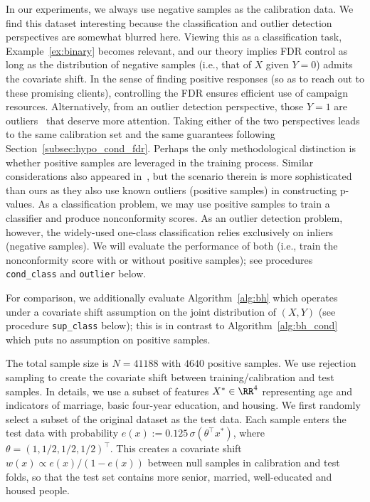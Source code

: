 In our experiments, we always use negative samples as the calibration data.
We find this dataset interesting because
the classification and outlier detection perspectives
are somewhat blurred here.
Viewing this as a classification task, Example~\ref{ex:binary}
becomes relevant, and our theory implies FDR control as long as the
distribution of negative samples
(i.e., that of $X$ given $Y=0$) admits the covariate shift.
In the sense of finding positive responses (so as to reach out
to these promising clients),
controlling the FDR ensures efficient use of campaign resources.
Alternatively, from an outlier detection perspective,
those $Y=1$ are outliers~\cite{pang2019deep} that
deserve more attention.
Taking either of the two perspectives leads to the same calibration set
and the same guarantees following Section~\ref{subsec:hypo_cond_fdr}.
%
Perhaps the only methodological distinction is
whether positive samples are leveraged in the
training process. Similar considerations
also appeared in~\cite{liang2022integrative}, but the scenario therein
is more sophisticated than ours as they also use
known outliers (positive samples) in
constructing p-values.
As a classification problem, we may use positive samples to train
a classifier and produce nonconformity scores.
As an outlier detection problem, however,
the widely-used  one-class classification
relies exclusively on inliers (negative samples).
We will evaluate the performance of both
(i.e., train the nonconformity score with or without positive samples);
see procedures \texttt{cond\_class} and \texttt{outlier} below.

For comparison, we additionally evaluate Algorithm~\ref{alg:bh}
which operates under a covariate shift assumption
on the joint distribution of $(X,Y)$ (see procedure \texttt{sup\_class} below); this is in contrast
to Algorithm~\ref{alg:bh_cond} which puts no assumption on positive samples.

The total sample size is $N=41188$ with $4640$ positive samples.
We use rejection sampling to create the covariate shift between
training/calibration and test samples. In details, we use a subset of features $X^*\in \RR^4$
representing age and indicators of marriage,
basic four-year education, and housing. We first randomly select a subset of the original dataset as the test data.
Each sample enters the test data with probability
$e(x):=0.125\, \sigma({\theta^\top x^*})$, where $\theta=(1,1/2,1/2,1/2)^\top$.  This creates a covariate shift $w(x)\propto e(x)/(1-e(x))$ between
null samples in calibration and test folds, so that
the test set contains more senior, married, well-educated and housed people.

